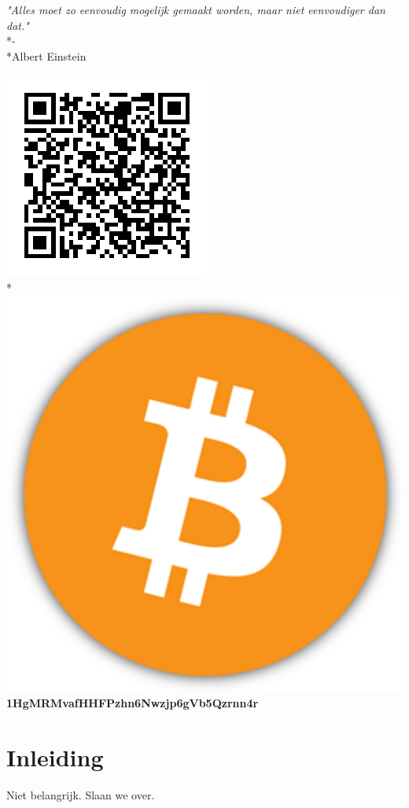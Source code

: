 \documentclass[10pt]{article}
\begin{document}
\begin{center}
\textit{"Alles moet zo eenvoudig mogelijk gemaakt worden, maar niet eenvoudiger dan dat."}\\*-\\*Albert Einstein
\end{center}
\begin{center}
\includegraphics[scale=0.5]{BitcoinAddress.png}\\*
\includegraphics[scale=0.02]{Bitcoin.png} \textbf{1HgMRMvafHHFPzhn6Nwzjp6gVb5Qzrnn4r}
\end{center}
\clearpage
\section{Inleiding}
Niet belangrijk. Slaan we over.
\end{document}
